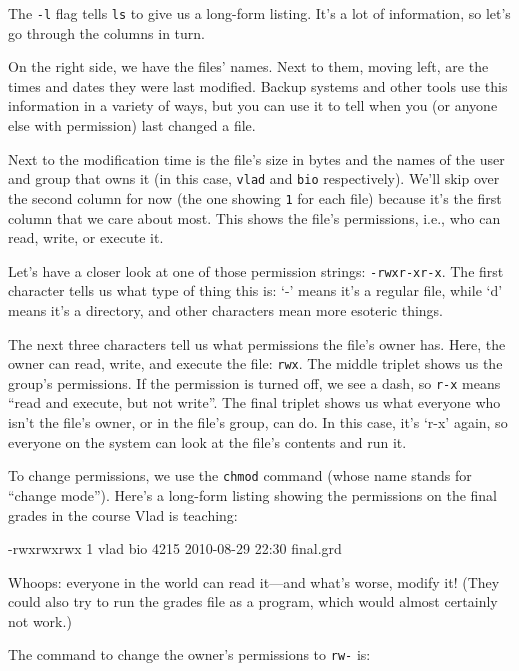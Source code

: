 The \texttt{-l} flag tells \texttt{ls} to give us a long-form listing.
It's a lot of information, so let's go through the columns in turn.

On the right side, we have the files' names. Next to them, moving left,
are the times and dates they were last modified. Backup systems and
other tools use this information in a variety of ways, but you can use
it to tell when you (or anyone else with permission) last changed a
file.

Next to the modification time is the file's size in bytes and the names
of the user and group that owns it (in this case, \texttt{vlad} and
\texttt{bio} respectively). We'll skip over the second column for now
(the one showing \texttt{1} for each file) because it's the first column
that we care about most. This shows the file's permissions, i.e., who
can read, write, or execute it.

Let's have a closer look at one of those permission strings:
\texttt{-rwxr-xr-x}. The first character tells us what type of thing
this is: `-' means it's a regular file, while `d' means it's a
directory, and other characters mean more esoteric things.

The next three characters tell us what permissions the file's owner has.
Here, the owner can read, write, and execute the file: \texttt{rwx}. The
middle triplet shows us the group's permissions. If the permission is
turned off, we see a dash, so \texttt{r-x} means ``read and execute, but
not write''. The final triplet shows us what everyone who isn't the
file's owner, or in the file's group, can do. In this case, it's `r-x'
again, so everyone on the system can look at the file's contents and run
it.

To change permissions, we use the \texttt{chmod} command (whose name
stands for ``change mode''). Here's a long-form listing showing the
permissions on the final grades in the course Vlad is teaching:


\begin{VerbOut}
-rwxrwxrwx 1 vlad bio  4215  2010-08-29 22:30 final.grd
\end{VerbOut}

Whoops: everyone in the world can read it---and what's worse, modify it!
(They could also try to run the grades file as a program, which would
almost certainly not work.)

The command to change the owner's permissions to \texttt{rw-} is:

